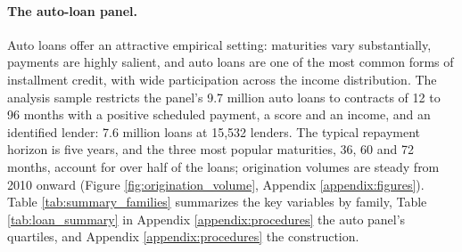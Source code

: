 \paragraph{The auto-loan panel.} Auto loans offer an attractive empirical setting: maturities vary substantially, payments are highly salient, and auto loans are one of the most common forms of installment credit, with wide participation across the income distribution. The analysis sample restricts the panel's 9.7 million auto loans to contracts of 12 to 96 months with a positive scheduled payment, a score and an income, and an identified lender: 7.6 million loans at 15,532 lenders. The typical repayment horizon is five years, and the three most popular maturities, 36, 60 and 72 months, account for over half of the loans; origination volumes are steady from 2010 onward (Figure \ref{fig:origination_volume}, Appendix \ref{appendix:figures}). Table \ref{tab:summary_families} summarizes the key variables by family, Table \ref{tab:loan_summary} in Appendix \ref{appendix:procedures} the auto panel's quartiles, and Appendix \ref{appendix:procedures} the construction.
